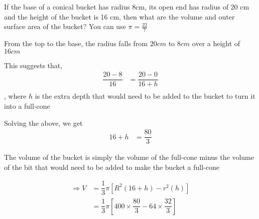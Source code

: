 
%
%
%
%
% 

\question[5] If the base of a conical bucket has radius 8cm, its open end has radius 
of 20 cm and the height of the bucket is 16 cm, then what are the volume and outer 
surface area of the bucket? You can use $\pi = \frac{22}{7}$

\ifprintanswers
\fi 

\begin{solution}[\fullpage]
	From the top to the base, the radius falls from $20cm$ to $8cm$ over a height 
	of $16cm$
	
	This suggests that, 
	\begin{align}
		\dfrac{20-8}{16} &= \dfrac{20-0}{16+h} \\
	\end{align}
	, where $h$ is the extra depth that would need to be added to the bucket
	to turn it into a full-cone
	
	Solving the above, we get 
	\begin{align}
		16 + h &= \dfrac{80}{3}
	\end{align}
	
	The volume of the bucket is simply the volume of the full-cone 
	minus the volume of the bit that would need to be added to make 
	the  bucket a full-cone
	
	\begin{align}
		\Rightarrow V &= \dfrac{1}{3}\pi\left[R^2(16+h) - r^2(h)\right] \\
		              &= \dfrac{1}{3}\pi\left[400\times\dfrac{80}{3} - 64\times\dfrac{32}{3}\right]
	\end{align}
	
\end{solution}
